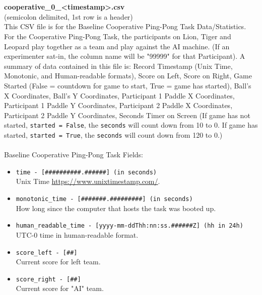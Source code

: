 \begin{description}
\begin{addmargin}[0em]{0em}
        \textbf{\\\\}
        \begin{addmargin}[1em]{0em} %
            \textbf{cooperative\_0\_<timestamp>.csv}\\(semicolon delimited, 1st row is a header)\\
            This CSV file is for the Baseline Cooperative Ping-Pong Task Data/Statistics.
            For the Cooperative Ping-Pong Task, the participants on Lion, Tiger and Leopard play together as a team and play against the AI machine.
            (If an experimenter sat-in, the column name will be "99999" for that Participant).
            A summary of data contained in this file is: Record Timestamp (Unix Time, Monotonic, and Human-readable formats),
            Score on Left, Score on Right, Game Started (False = countdown for game to start, True = game has started),
            Ball's X Coordinates, Ball's Y Coordinates, Participant 1 Paddle X Coordinates, Participant 1 Paddle Y Coordinates,
            Participant 2 Paddle X Coordinates, Participant 2 Paddle Y Coordinates, Seconds Timer on Screen (If game has not started, \verb|started = False|,
            the \verb|seconds| will count down from 10 to 0. If game has started, \verb|started = True|, the \verb|seconds| will count down from 120 to 0.)\\\\
            Baseline Cooperative Ping-Pong Task Fields:
            \begin{itemize}
                \item \verb|time - [##########.######] (in seconds)|\\Unix Time \href{https://www.unixtimestamp.com/}{https://www.unixtimestamp.com/}.
                \item \verb|monotonic_time - [#######.#########] (in seconds)|\\How long since the computer that hosts the task was booted up.
                \item \verb|human_readable_time - [yyyy-mm-ddThh:nn:ss.######Z] (hh in 24h)|\\UTC-0 time in human-readable format.
                \item \verb|score_left - [##]|\\Current score for left team.
                \item \verb|score_right - [##]|\\Current score for "AI" team.

\end{itemize}
\end{addmargin}
\end{addmargin}
\end{description}
